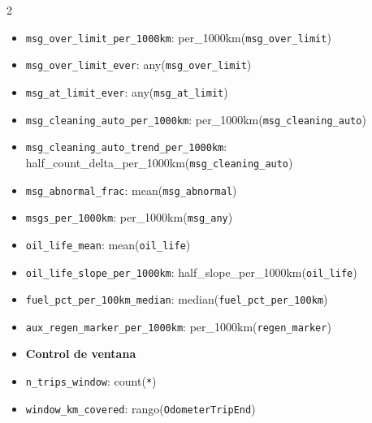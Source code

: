 \begin{multicols}{2}
\begin{itemize}[leftmargin=0pt,itemsep=0pt,label={}]
\item[] \texttt{msg\_\allowbreak{}over\_\allowbreak{}limit\_\allowbreak{}per\_\allowbreak{}1000km}: per\_\allowbreak{}1000km(\texttt{msg\_\allowbreak{}over\_\allowbreak{}limit})
\item[] \texttt{msg\_\allowbreak{}over\_\allowbreak{}limit\_\allowbreak{}ever}: any(\texttt{msg\_\allowbreak{}over\_\allowbreak{}limit})
\item[] \texttt{msg\_\allowbreak{}at\_\allowbreak{}limit\_\allowbreak{}ever}: any(\texttt{msg\_\allowbreak{}at\_\allowbreak{}limit})
\item[] \texttt{msg\_\allowbreak{}cleaning\_\allowbreak{}auto\_\allowbreak{}per\_\allowbreak{}1000km}: per\_\allowbreak{}1000km(\texttt{msg\_\allowbreak{}cleaning\_\allowbreak{}auto})
\item[] \texttt{msg\_\allowbreak{}cleaning\_\allowbreak{}auto\_\allowbreak{}trend\_\allowbreak{}per\_\allowbreak{}1000km}: half\_\allowbreak{}count\_\allowbreak{}delta\_\allowbreak{}per\_\allowbreak{}1000km(\texttt{msg\_\allowbreak{}cleaning\_\allowbreak{}auto})
\item[] \texttt{msg\_\allowbreak{}abnormal\_\allowbreak{}frac}: mean(\texttt{msg\_\allowbreak{}abnormal})
\item[] \texttt{msgs\_\allowbreak{}per\_\allowbreak{}1000km}: per\_\allowbreak{}1000km(\texttt{msg\_\allowbreak{}any})
\item[] \texttt{oil\_\allowbreak{}life\_\allowbreak{}mean}: mean(\texttt{oil\_\allowbreak{}life})
\item[] \texttt{oil\_\allowbreak{}life\_\allowbreak{}slope\_\allowbreak{}per\_\allowbreak{}1000km}: half\_\allowbreak{}slope\_\allowbreak{}per\_\allowbreak{}1000km(\texttt{oil\_\allowbreak{}life})
\item[] \texttt{fuel\_\allowbreak{}pct\_\allowbreak{}per\_\allowbreak{}100km\_\allowbreak{}median}: median(\texttt{fuel\_\allowbreak{}pct\_\allowbreak{}per\_\allowbreak{}100km})
\item[] \texttt{aux\_regen\_\allowbreak{}marker\_\allowbreak{}per\_\allowbreak{}1000km}: per\_\allowbreak{}1000km(\texttt{regen\_\allowbreak{}marker})
\item[] \textbf{Control de ventana}
\item[] \texttt{n\_\allowbreak{}trips\_\allowbreak{}window}: count(\texttt{*})
\item[] \texttt{window\_\allowbreak{}km\_\allowbreak{}covered}: rango(\texttt{OdometerTripEnd})
\end{itemize}
\end{multicols}
